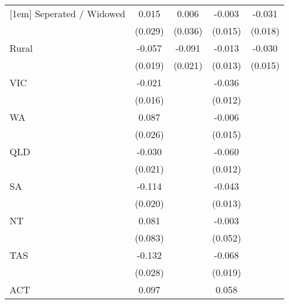 {\begin{tabular}{l*{4}{c}}
[1em]
Seperated / Widowed &       0.015         &       0.006         &      -0.003         &      -0.031         \\
                    &     (0.029)         &     (0.036)         &     (0.015)         &     (0.018)         \\
[1em]
Rural               &      -0.057\sym{**} &      -0.091\sym{***}&      -0.013         &      -0.030\sym{*}  \\
                    &     (0.019)         &     (0.021)         &     (0.013)         &     (0.015)         \\
[1em]
VIC                 &      -0.021         &                     &      -0.036\sym{**} &                     \\
                    &     (0.016)         &                     &     (0.012)         &                     \\
[1em]
WA                  &       0.087\sym{***}&                     &      -0.006         &                     \\
                    &     (0.026)         &                     &     (0.015)         &                     \\
[1em]
QLD                 &      -0.030         &                     &      -0.060\sym{***}&                     \\
                    &     (0.021)         &                     &     (0.012)         &                     \\
[1em]
SA                  &      -0.114\sym{***}&                     &      -0.043\sym{**} &                     \\
                    &     (0.020)         &                     &     (0.013)         &                     \\
[1em]
NT                  &       0.081         &                     &      -0.003         &                     \\
                    &     (0.083)         &                     &     (0.052)         &                     \\
[1em]
TAS                 &      -0.132\sym{***}&                     &      -0.068\sym{***}&                     \\
                    &     (0.028)         &                     &     (0.019)         &                     \\
[1em]
ACT                 &       0.097\sym{*}  &                     &       0.058\sym{**} &                     \\

\end{tabular}}
